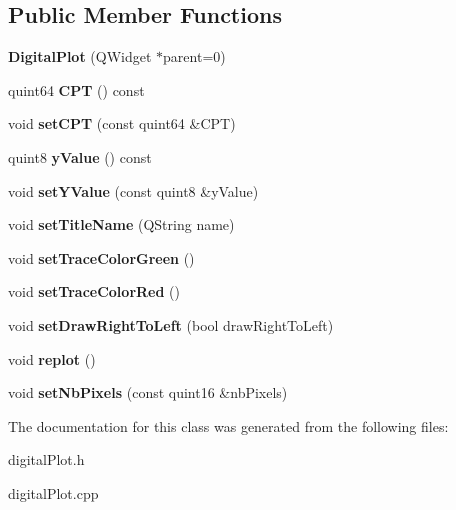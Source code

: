\subsection*{Public Member Functions}
\begin{DoxyCompactItemize}
\item 
\mbox{\label{class_digital_plot_a8e3127ffcc4dd5b0fd479439c7cb6f20}} 
{\bfseries Digital\+Plot} (Q\+Widget $\ast$parent=0)
\item 
\mbox{\label{class_digital_plot_a8bc240451b73acddfc1d9bcdd31ac345}} 
quint64 {\bfseries C\+PT} () const
\item 
\mbox{\label{class_digital_plot_aadb0daa4b7f46f98fde321962b564b27}} 
void {\bfseries set\+C\+PT} (const quint64 \&C\+PT)
\item 
\mbox{\label{class_digital_plot_a884cb57bb84351a2ba35610ab2effc60}} 
quint8 {\bfseries y\+Value} () const
\item 
\mbox{\label{class_digital_plot_a31f258f6eb0f26738b260a14b8191d02}} 
void {\bfseries set\+Y\+Value} (const quint8 \&y\+Value)
\item 
\mbox{\label{class_digital_plot_a4f654ab018a8080c2d42260013282784}} 
void {\bfseries set\+Title\+Name} (Q\+String name)
\item 
\mbox{\label{class_digital_plot_a4c4545547ae323bd13f1af1401c1d0d4}} 
void {\bfseries set\+Trace\+Color\+Green} ()
\item 
\mbox{\label{class_digital_plot_a5b3177989f5ed2102ce6b90ea8162b4b}} 
void {\bfseries set\+Trace\+Color\+Red} ()
\item 
\mbox{\label{class_digital_plot_aedc630a7c55bad65ac0540edee3ef4ea}} 
void {\bfseries set\+Draw\+Right\+To\+Left} (bool draw\+Right\+To\+Left)
\item 
\mbox{\label{class_digital_plot_ae72dfc8ad5e0c9ff50f12d06f8ce8aa6}} 
void {\bfseries replot} ()
\item 
\mbox{\label{class_digital_plot_ab634d93f6f8a1e9664a2b40047dbbc68}} 
void {\bfseries set\+Nb\+Pixels} (const quint16 \&nb\+Pixels)
\end{DoxyCompactItemize}


The documentation for this class was generated from the following files\+:\begin{DoxyCompactItemize}
\item 
digital\+Plot.\+h\item 
digital\+Plot.\+cpp\end{DoxyCompactItemize}
